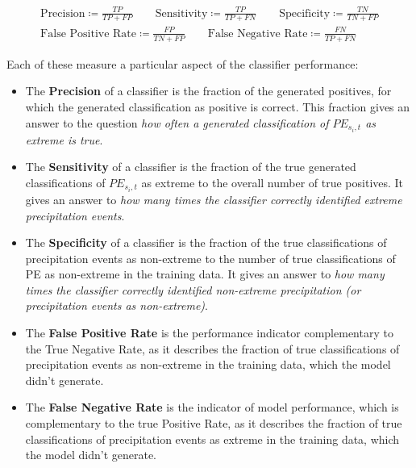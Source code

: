 \documentclass[
  12pt,
]{article}
\begin{document}
\begin{mdframed}[leftline = true, rightline = true, bottomline = false, topline = false, frametitle = {Classifier Performance Indicators}]
\setlength{\jot}{3ex}
\begin{equation}
\begin{gathered}
\text{Precision} \coloneqq \frac{TP}{TP+FP} \qquad
\text{Sensitivity} \coloneqq \frac{TP}{TP+FN} \qquad
\text{Specificity} \coloneqq \frac{TN}{TN+FP} \\
\text{False Positive Rate} \coloneqq \frac{FP}{TN+FP} \qquad
\text{False Negative Rate} \coloneqq \frac{FN}{TP+FN}
\end{gathered}
\end{equation}
\end{mdframed}

Each of these measure a particular aspect of the classifier performance:

\begin{itemize}[label={}]

\item The \textbf{Precision} of a classifier is the fraction of the generated positives, for which the generated classification as positive is correct. This fraction gives an answer to the question \textit{how often a generated classification of $PE_{s_{i},t}$ as extreme is true}.
\item The \textbf{Sensitivity} of a classifier is the fraction of the true generated classifications of $PE_{s_{i},t}$ as extreme to the overall number of true positives. It gives an answer to \textit{how many times the classifier correctly identified extreme precipitation events}.
\item The \textbf{Specificity} of a classifier is the fraction of the true classifications of precipitation events as non-extreme to the number of true classifications of PE as non-extreme in the training data. It gives an answer to \textit{how many times the classifier correctly identified non-extreme precipitation (or precipitation events as non-extreme)}.
\item The \textbf{False Positive Rate} is the performance indicator complementary to the True Negative Rate, as it describes the fraction of true classifications of precipitation events as non-extreme in the training data, which the model didn't generate.
\item The \textbf{False Negative Rate} is the indicator of model performance, which is complementary to the true Positive Rate, as it describes the fraction of true classifications of precipitation events as extreme in the training data, which the model didn't generate.
\end{itemize}
\end{document}
